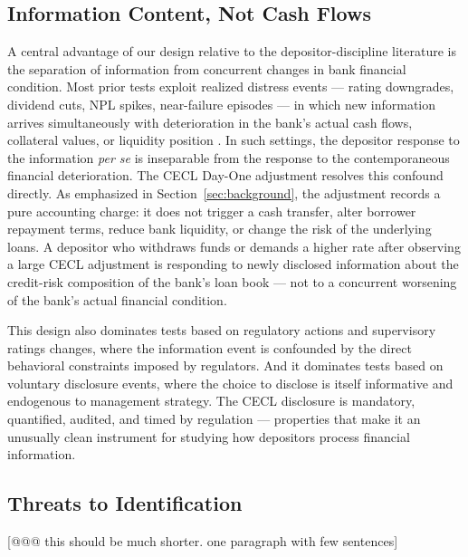 \subsection{Information Content, Not Cash Flows}
\label{sec:identification:mechanism}

A central advantage of our design relative to the depositor-discipline
literature is the separation of information from concurrent changes in bank
financial condition.  Most prior tests exploit realized distress events ---
rating downgrades, dividend cuts, NPL spikes, near-failure episodes --- in which
new information arrives simultaneously with deterioration in the bank's actual
cash flows, collateral values, or liquidity position
\citep{flannery1996evidence, martinez2001depositors, iyer2016tale}.  In such
settings, the depositor response to the information \textit{per se} is
inseparable from the response to the contemporaneous financial deterioration.
The CECL Day-One adjustment resolves this confound directly.  As emphasized in
Section~\ref{sec:background}, the adjustment records a pure accounting charge:
it does not trigger a cash transfer, alter borrower repayment terms, reduce
bank liquidity, or change the risk of the underlying loans.  A depositor who
withdraws funds or demands a higher rate after observing a large CECL
adjustment is responding to newly disclosed information about the credit-risk
composition of the bank's loan book --- not to a concurrent worsening of the
bank's actual financial condition.

This design also dominates tests based on regulatory actions and supervisory
ratings changes, where the information event is confounded by the direct
behavioral constraints imposed by regulators.  And it dominates tests based
on voluntary disclosure events, where the choice to disclose is itself
informative and endogenous to management strategy.  The CECL disclosure is
mandatory, quantified, audited, and timed by regulation --- properties that
make it an unusually clean instrument for studying how depositors process
financial information.

\subsection{Threats to Identification} [@@@ this should be much shorter. one paragraph with few sentences]
\label{sec:identification:threats}

